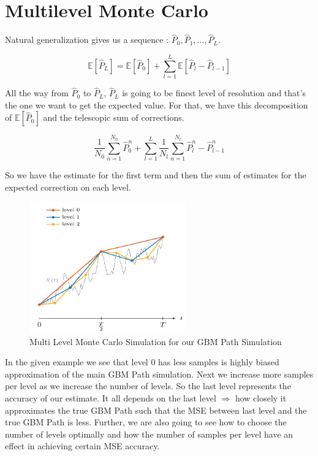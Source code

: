 \documentclass[12pt]{article}
\newcommand{\E}{\mathbb{E}}
\begin{document}
\section{Multilevel Monte Carlo}

Natural generalization gives us a sequence : $\hat{P}_0, \hat{P}_1, \ldots , \hat{P}_L$. 

\begin{equation} \E[\hat{P}_L] = \E[\hat{P}_0] + \sum_{l=1}^{L} \E[\hat{P}_l - \hat{P}_{l-1}]\end{equation} 

All the way from $\hat{P}_0$ to $\hat{P}_L$, $\hat{P}_L$ is going to be finest level of resolution and that's the one we want to get the expected value. For that, we have this decomposition of $\E[\hat{P}_0]$ and the telescopic sum of corrections. 

\begin{equation} \frac{1}{N_0}\sum_{n=1}^{N_0} \hat{P}^n_0 +  \sum_{l=1}^{L} \frac{1}{N_l} \sum_{n=1}^{N_l} \hat{P}^n_l - \hat{P}^n_{l-1}\end{equation} 

So we have the estimate for the first term and then the sum of estimates for the expected correction on each level.

\begin{figure}[h!]
\centering
\includegraphics[width=0.6\textwidth]{MLMC_GBM.png}
\caption{Multi Level Monte Carlo Simulation for our GBM Path Simulation}
\end{figure}

In the given example we see that level 0 has less samples is highly biased approximation of the main GBM Path simulation. Next we increase more samples per level as we increase the number of levels. So the last level represents the accuracy of our estimate. It all depends on the last level $\Rightarrow$ how closely it approximates the true GBM Path such that the MSE between last level and the true GBM Path is less. Further, we are also going to see how to choose the number of levels optimally and how the number of samples per level have an effect in achieving certain MSE accuracy. 
\end{document}
